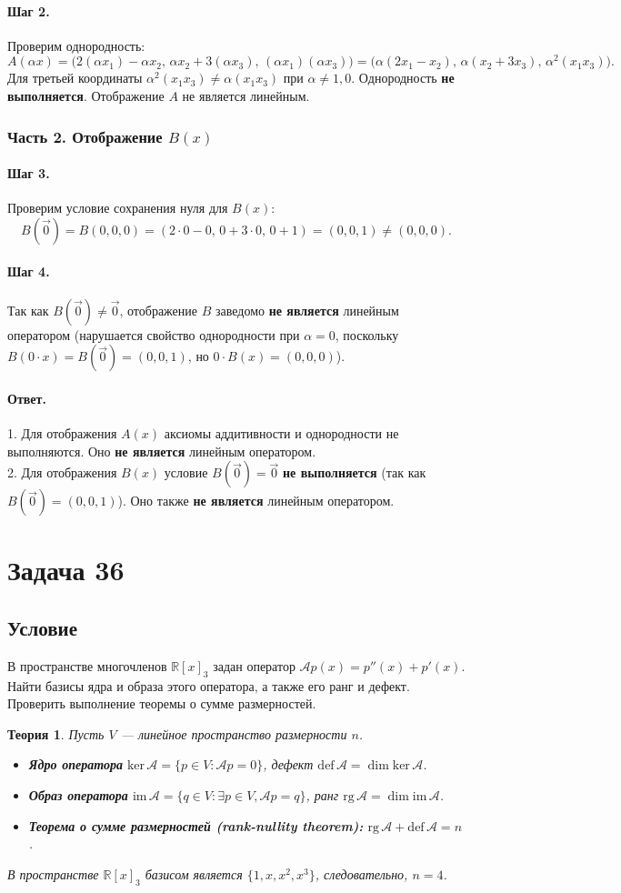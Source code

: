 \documentclass[12pt,a4paper]{article}
\theoremstyle{solution}
\newtheorem*{theory}{Теория}
\newcommand{\task}[1]{\newpage\section*{Задача #1}}
\newcommand{\answer}{\paragraph{Ответ.}}
\newcommand{\step}[1]{\paragraph{Шаг #1.}}
\newcommand{\R}{\mathbb{R}}
\begin{document}
\step{2} Проверим однородность:
\[
A(\alpha x) = \Big(2(\alpha x_1) - \alpha x_2,\, \alpha x_2 + 3(\alpha x_3),\, (\alpha x_1)(\alpha x_3)\Big) = \Big(\alpha(2x_1 - x_2),\, \alpha(x_2 + 3x_3),\, \alpha^2(x_1 x_3)\Big).
\]
Для третьей координаты $\alpha^2(x_1 x_3) \neq \alpha(x_1 x_3)$ при $\alpha \neq 1, 0$. Однородность \textbf{не выполняется}. Отображение $A$ не является линейным.

\subsubsection*{Часть 2. Отображение $B(x)$}

\step{3} Проверим условие сохранения нуля для $B(x)$:
\[
B(\vec{0}) = B(0, 0, 0) = (2\cdot 0 - 0,\, 0 + 3\cdot 0,\, 0 + 1) = (0, 0, 1) \neq (0, 0, 0).
\]

\step{4} Так как $B(\vec{0}) \neq \vec{0}$, отображение $B$ заведомо \textbf{не является} линейным оператором (нарушается свойство однородности при $\alpha = 0$, поскольку $B(0 \cdot x) = B(\vec{0}) = (0, 0, 1)$, но $0 \cdot B(x) = (0, 0, 0)$).

\answer
1. Для отображения $A(x)$ аксиомы аддитивности и однородности не выполняются. Оно \textbf{не является} линейным оператором.\\
2. Для отображения $B(x)$ условие $B(\vec{0}) = \vec{0}$ \textbf{не выполняется} (так как $B(\vec{0}) = (0, 0, 1)$). Оно также \textbf{не является} линейным оператором.

\task{36}
\subsection*{Условие}
В пространстве многочленов $\R[x]_3$ задан оператор $\mathcal{A}p(x) = p''(x) + p'(x)$. Найти базисы ядра и образа этого оператора, а также его ранг и дефект. Проверить выполнение теоремы о сумме размерностей.

\begin{theory}
Пусть $V$ — линейное пространство размерности $n$. 
\begin{itemize}
    \item \textbf{Ядро оператора} $\mathrm{ker}\,\mathcal{A} = \{p \in V : \mathcal{A}p = 0\}$, дефект $\mathrm{def}\,\mathcal{A} = \dim \mathrm{ker}\,\mathcal{A}$.
    \item \textbf{Образ оператора} $\mathrm{im}\,\mathcal{A} = \{q \in V : \exists p \in V, \mathcal{A}p = q\}$, ранг $\mathrm{rg}\,\mathcal{A} = \dim \mathrm{im}\,\mathcal{A}$.
    \item \textbf{Теорема о сумме размерностей (rank-nullity theorem):} $\mathrm{rg}\,\mathcal{A} + \mathrm{def}\,\mathcal{A} = n$.
\end{itemize}
В пространстве $\R[x]_3$ базисом является $\{1, x, x^2, x^3\}$, следовательно, $n = 4$.
\end{theory}
\end{document}
